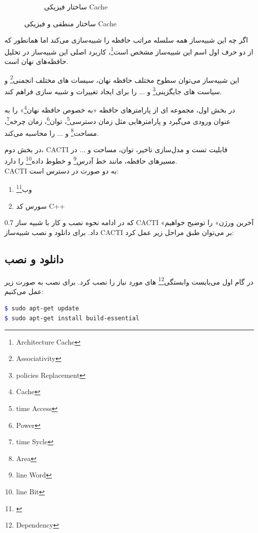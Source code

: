 \documentclass[12pt]{exam}
\begin{document}
\begin{questions}
\begin{figure}
\begin{subfigure}[b]{0.3\textwidth}
		\caption{ساختار فیزیکی Cache}
		\label{ساختار فیزیکی Cache}
	\end{subfigure}
	\hfill

	\caption{ساختار منطقی و فیزیکی Cache}
	\label{ساختار منطقی و فیزیکی Cache}
\end{figure}






 اگر چه این شبیه‌ساز همه سلسله مراتب حافظه را شبیه‌سازی می‌کند اما همانطور که از دو حرف اول اسم این شبیه‌ساز مشخص است\footnote{Architecture Cache}، کاربرد اصلی این شبیه‌ساز در تحلیل حافظه‌های نهان است.
 
 این شبیه‌ساز می‌توان سطوح مختلف حافظه نهان، سیسات های مختلف انجمنی\footnote{Associativity} و سیاست های جایگزینی\footnote{policies Replacement} و ... را برای ایجاد تغییرات و شبیه سازی فراهم کند.

در بخش اول، مجموعه ای از پارامتر‌های حافظه «به خصوص حافظه نهان\footnote{Cache}» را به عنوان ورودی می‌گیرد و پارامتر‌هایی مثل زمان دسترسی\footnote{time Access}، توان\footnote{Power}، زمان چرخه\footnote{time Sycle}، مساحت\footnote{Area} و ... را محاسبه می‌کند.

در بخش دوم، CACTI قابلیت تست و مدل‌سازی تاخیر، توان، مساحت و ... در مسیر‌های حافظه، مانند خط آدرس\footnote{line Word} و خطوط داده\footnote{line Bit} را دارد.\\


 
CACTI به دو صورت در دسترس است:
\begin{enumerate}
	\item \footnote{\href{https://quid.hpl.hp.com:9081/cacti/}{\textcolor{magenta}{}}}وب
	\item سورس کد C++ 
\end{enumerate}

که در ادامه نحوه نصب و کار با شبیه ساز 0.7 CACTI «آخرین ورژن» را توضیح خواهیم داد. برای دانلود و نصب شبیه‌ساز CACTI بر می‌توان طبق مراحل زیر عمل کرد:

\subsection{دانلود و نصب}


در گام اول می‌بایست وابستگی\footnote{Dependency} های مورد نیاز را نصب کرد. برای نصب به صورت زیر عمل می‌کنیم:\\
\begin{latin}
	\texttt{\textcolor{blue}{\$} sudo apt-get update}\\
	\texttt{\textcolor{blue}{\$} sudo apt-get install build-essential}
\end{latin}




\end{questions}
\end{document}
